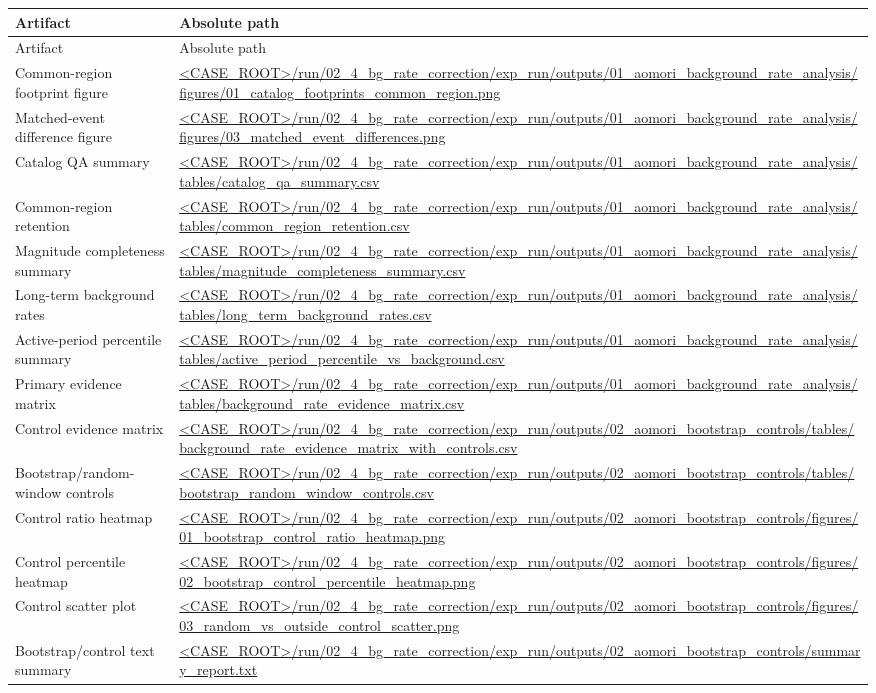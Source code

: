 \documentclass[11pt]{article}
\begin{document}
\begin{longtable}{>{\raggedright\arraybackslash}p{}>{\raggedright\arraybackslash}p{}}
\toprule
Artifact & Absolute path \\
\midrule
\endfirsthead
\toprule
Artifact & Absolute path \\
\midrule
\endhead
Common-region footprint figure & \url{<CASE_ROOT>/run/02_4_bg_rate_correction/exp_run/outputs/01_aomori_background_rate_analysis/figures/01_catalog_footprints_common_region.png} \\
Matched-event difference figure & \url{<CASE_ROOT>/run/02_4_bg_rate_correction/exp_run/outputs/01_aomori_background_rate_analysis/figures/03_matched_event_differences.png} \\
Catalog QA summary & \url{<CASE_ROOT>/run/02_4_bg_rate_correction/exp_run/outputs/01_aomori_background_rate_analysis/tables/catalog_qa_summary.csv} \\
Common-region retention & \url{<CASE_ROOT>/run/02_4_bg_rate_correction/exp_run/outputs/01_aomori_background_rate_analysis/tables/common_region_retention.csv} \\
Magnitude completeness summary & \url{<CASE_ROOT>/run/02_4_bg_rate_correction/exp_run/outputs/01_aomori_background_rate_analysis/tables/magnitude_completeness_summary.csv} \\
Long-term background rates & \url{<CASE_ROOT>/run/02_4_bg_rate_correction/exp_run/outputs/01_aomori_background_rate_analysis/tables/long_term_background_rates.csv} \\
Active-period percentile summary & \url{<CASE_ROOT>/run/02_4_bg_rate_correction/exp_run/outputs/01_aomori_background_rate_analysis/tables/active_period_percentile_vs_background.csv} \\
Primary evidence matrix & \url{<CASE_ROOT>/run/02_4_bg_rate_correction/exp_run/outputs/01_aomori_background_rate_analysis/tables/background_rate_evidence_matrix.csv} \\
Control evidence matrix & \url{<CASE_ROOT>/run/02_4_bg_rate_correction/exp_run/outputs/02_aomori_bootstrap_controls/tables/background_rate_evidence_matrix_with_controls.csv} \\
Bootstrap/random-window controls & \url{<CASE_ROOT>/run/02_4_bg_rate_correction/exp_run/outputs/02_aomori_bootstrap_controls/tables/bootstrap_random_window_controls.csv} \\
Control ratio heatmap & \url{<CASE_ROOT>/run/02_4_bg_rate_correction/exp_run/outputs/02_aomori_bootstrap_controls/figures/01_bootstrap_control_ratio_heatmap.png} \\
Control percentile heatmap & \url{<CASE_ROOT>/run/02_4_bg_rate_correction/exp_run/outputs/02_aomori_bootstrap_controls/figures/02_bootstrap_control_percentile_heatmap.png} \\
Control scatter plot & \url{<CASE_ROOT>/run/02_4_bg_rate_correction/exp_run/outputs/02_aomori_bootstrap_controls/figures/03_random_vs_outside_control_scatter.png} \\
Bootstrap/control text summary & \url{<CASE_ROOT>/run/02_4_bg_rate_correction/exp_run/outputs/02_aomori_bootstrap_controls/summary_report.txt} \\
\bottomrule
\end{longtable}
\end{document}
